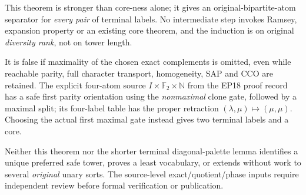 \begin{remark}
\label{rem:ep-core-scope}
This theorem is stronger than core-ness alone;
it gives an original-bipartite-atom separator
for \emph{every pair} of terminal labels.
No intermediate step invokes Ramsey,
expansion property or an existing core theorem,
and the induction is on original
\emph{diversity rank}, not on tower length.

It is false if maximality of the chosen exact
complements is omitted, even while reachable
parity, full character transport, homogeneity,
SAP and CCO are retained. The explicit
four-atom source \(I\times\mathbb F_2\times\mathbb N\)
from the EP18 proof record has a safe first
parity orientation using the \emph{nonmaximal}
clone gate, followed by a maximal split;
its four-label table has the proper retraction
\((\lambda,\mu)\mapsto(\mu,\mu)\).
Choosing the actual first maximal gate
instead gives two terminal labels and a core.

Neither this theorem nor the shorter terminal
diagonal-palette lemma identifies a unique
preferred safe tower, proves a least vocabulary,
or extends without work to several \emph{original}
unary sorts. The source-level exact/quotient/phase
inputs require independent review before
formal verification or publication.
\end{remark}
